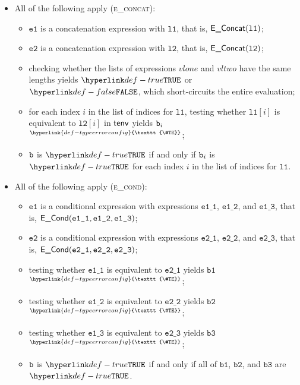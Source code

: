 \documentclass{book}
\newcommand\TypeErrorConfig[0]{\hyperlink{def-typeerrorconfig}{\texttt{\#TE}}}
\newcommand\ProseOrTypeError[0]{\hyperlink{def-proseortypeerror}{$^{\TypeErrorConfig}$}}
\newcommand\veone[0]{\texttt{e1}}
\newcommand\vetwo[0]{\texttt{e2}}
\newcommand\veoneone[0]{\texttt{e1\_1}}
\newcommand\veonetwo[0]{\texttt{e1\_2}}
\newcommand\veonethree[0]{\texttt{e1\_3}}
\newcommand\vetwoone[0]{\texttt{e2\_1}}
\newcommand\vetwotwo[0]{\texttt{e2\_2}}
\newcommand\vetwothree[0]{\texttt{e2\_3}}
\newcommand\vbone[0]{\texttt{b1}}
\newcommand\vbtwo[0]{\texttt{b2}}
\newcommand\vbthree[0]{\texttt{b3}}
\newcommand\vlone[0]{\texttt{l1}}
\newcommand\vltwo[0]{\texttt{l2}}
\begin{document}
\begin{itemize}
  \item All of the following apply (\textsc{e\_concat}):
  \begin{itemize}
    \item $\veone$ is a concatenation expression with $\vlone$, that is, $\EConcat(\vlone)$;
    \item $\vetwo$ is a concatenation expression with $\vltwo$, that is, $\EConcat(\vltwo)$;
    \item checking whether the lists of expressions $vlone$ and $vltwo$ have the same lengths yields
          $\True$ or $\False$, which short-circuits the entire evaluation;
    \item for each index $i$ in the list of indices for $\vlone$, testing whether $\vlone[i]$ is equivalent to $\vltwo[i]$
          in $\textsf{tenv}$ yields $\texttt{b}_i$ \ProseOrTypeError;
    \item $\texttt{b}$ is $\True$ if and only if $\texttt{b}_i$ is $\True$ for each index $i$ in the list of indices for $\vlone$.
  \end{itemize}

  \item All of the following apply (\textsc{e\_cond}):
  \begin{itemize}
    \item $\veone$ is a conditional expression with expressions $\veoneone$, $\veonetwo$, and $\veonethree$,
          that is, $\ECond(\veoneone, \veonetwo, \veonethree)$;
    \item $\vetwo$ is a conditional expression with expressions $\vetwoone$, $\vetwotwo$, and $\vetwothree$,
          that is, $\ECond(\vetwoone, \vetwotwo, \vetwothree)$;
    \item testing whether $\veoneone$ is equivalent to $\vetwoone$ yields $\vbone$ \ProseOrTypeError;
    \item testing whether $\veonetwo$ is equivalent to $\vetwotwo$ yields $\vbtwo$ \ProseOrTypeError;
    \item testing whether $\veonethree$ is equivalent to $\vetwothree$ yields $\vbthree$ \ProseOrTypeError;
    \item $\texttt{b}$ is $\True$ if and only if all of $\vbone$, $\vbtwo$, and $\vbthree$ are $\True$.
  \end{itemize}


\end{itemize}
\end{document}
